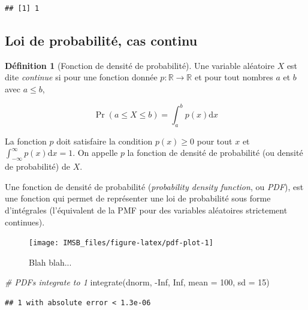 \documentclass[
  a4paper,11pt,twoside,onecolumn,openright,final,oldfontcommands]{memoir}
\newenvironment{Shaded}{\begin{snugshade}}{\end{snugshade}}
\newcommand{\AttributeTok}[1]{\textcolor[rgb]{0.77,0.63,0.00}{#1}}
\newcommand{\CommentTok}[1]{\textcolor[rgb]{0.56,0.35,0.01}{\textit{#1}}}
\newcommand{\ConstantTok}[1]{\textcolor[rgb]{0.00,0.00,0.00}{#1}}
\newcommand{\DecValTok}[1]{\textcolor[rgb]{0.00,0.00,0.81}{#1}}
\newcommand{\FunctionTok}[1]{\textcolor[rgb]{0.00,0.00,0.00}{#1}}
\newcommand{\NormalTok}[1]{#1}
\newcommand{\SpecialCharTok}[1]{\textcolor[rgb]{0.00,0.00,0.00}{#1}}
\theoremstyle{definition}
\newtheorem{definition}{Définition}[chapter]
\theoremstyle{definition}
\theoremstyle{definition}
\theoremstyle{definition}
\theoremstyle{remark}
\begin{document}
\begin{verbatim}
## [1] 1
\end{verbatim}

\hypertarget{loi-de-probabilituxe9-cas-continu}{%
\subsection{Loi de probabilité, cas continu}\label{loi-de-probabilituxe9-cas-continu}}

\begin{definition}[Fonction de densité de probabilité]
\protect\hypertarget{def:PDF}{}\label{def:PDF}Une variable aléatoire \(X\) est dite \emph{continue} si pour une fonction donnée \(p : \mathbb{R} \rightarrow \mathbb{R}\) et pour tout nombres \(a\) et \(b\) avec \(a \leq b\),

\[\Pr(a \leq X \leq b) = \int_{a}^{b} p(x) \mathrm{d} x\]

La fonction \(p\) doit satisfaire la condition \(p(x) \geq 0\) pour tout \(x\) et \(\int_{-\infty}^{\infty} p(x) \mathrm{d} x = 1\). On appelle \(p\) la fonction de densité de probabilité (ou densité de probabilité) de \(X\).
\end{definition}

Une fonction de densité de probabilité (\emph{probability density function}, ou \emph{PDF}), est une fonction qui permet de représenter une loi de probabilité sous forme d'intégrales (l'équivalent de la PMF pour des variables aléatoires strictement continues).

\begin{figure}[!htb]

{\centering \texttt{[image: IMSB\_files/figure-latex/pdf-plot-1]} 

}

\caption{Blah blah...}\label{fig:pdf-plot}
\end{figure}

\begin{Shaded}
\begin{Highlighting}[]
\CommentTok{\# PDFs integrate to 1}
\FunctionTok{integrate}\NormalTok{(dnorm, }\SpecialCharTok{{-}}\ConstantTok{Inf}\NormalTok{, }\ConstantTok{Inf}\NormalTok{, }\AttributeTok{mean =} \DecValTok{100}\NormalTok{, }\AttributeTok{sd =} \DecValTok{15}\NormalTok{)}
\end{Highlighting}
\end{Shaded}

\begin{verbatim}
## 1 with absolute error < 1.3e-06
\end{verbatim}
\end{document}
